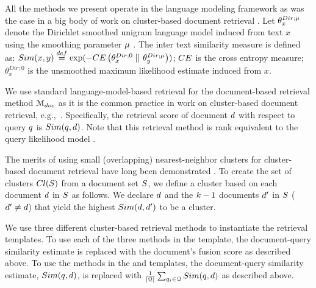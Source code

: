 All the methods we present operate in the language modeling framework
as was the case in a big body of work on cluster-based document
retrieval
\cite{Kurland+Lee:04a,Liu+Croft:04a,Kurland+Lee:06a,Liu+Croft:06a,Liu+Croft:06b,Kurland+Domshlak:08a,Kurland:09a,Kurland+Krikon:11a,Raiber+Kurland:13a}. Let
$\theta_x^{Dir; \mu}$ denote the Dirichlet smoothed unigram
language model induced from text $x$ using the smoothing parameter
$\mu$ \cite{Zhai+Lafferty:01a}. The inter text similarity measure is defined as:
$Sim(x,y) \stackrel{def}{=} \exp
(-CE\left(\theta_x^{Dir;0} \; \vert\vert \,\, \theta_y^{Dir;\mu}\right))$; $CE$ is the cross
entropy measure; $\theta_x^{Dir;0}$ is the unsmoothed maximum
likelihood estimate induced from $x$.


We use standard language-model-based retrieval \cite{Lafferty+Zhai:01a} for the document-based retrieval method ${\mathcal M_{doc}}$ as it is the common practice in work on cluster-based document retrieval, e.g.,~\cite{Kurland+Lee:04a,Kurland+Domshlak:08a,Kurland:09a,Raiber+Kurland:13a}.
Specifically, the retrieval score of document $d$ with respect to query $q$ is $Sim(q,d)$. Note that this retrieval method is rank equivalent to the query likelihood model \cite{Song+Croft:99a}.

 The merits of using small
(overlapping) nearest-neighbor clusters for cluster-based document
retrieval have long been demonstrated
\cite{Kurland+Lee:04a,Kurland+Lee:06a,Liu+Croft:06a,Liu+Croft:06b,Kurland:09a,Raiber+Kurland:13a}. To
create the set of clusters $Cl(S)$ from a document set
$S$, we define a cluster based on each document $d$ in
$S$ as follows. We declare $d$ and the $k-1$ documents $d'$ in $S$ ($d' \ne d$) that yield the highest $Sim(d,d')$ to be a cluster. 

 We use three different
cluster-based retrieval methods to instantiate the retrieval
templates. To use each of the three methods in the \fuseClust template, the document-query similarity estimate is replaced with the document's fusion score as described above. To use the methods in the \poolClust and \feature templates, the document-query similarity estimate, $Sim(q,d)$, is replaced with $\frac{1}{\vert {\mathcal Q} \vert} \sum_{q_i \in {\mathcal Q}} Sim(q,d)$ as described above. 

